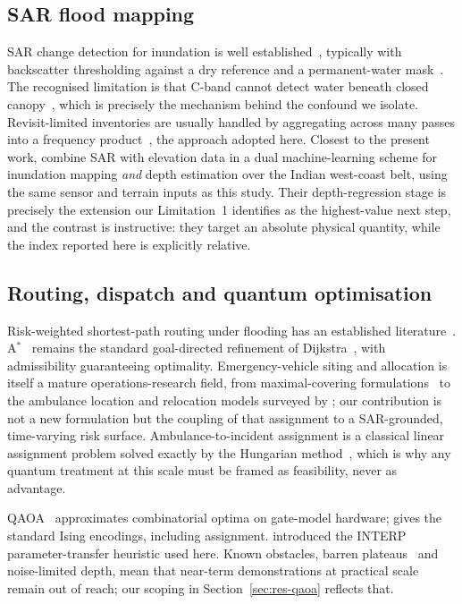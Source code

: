 \documentclass[11pt,a4paper]{article}
\begin{document}
\subsection{SAR flood mapping}
SAR change detection for inundation is well established~\citep{martinis2009,
twele2016,shen2019}, typically with backscatter thresholding against a dry
reference and a permanent-water mask~\citep{pekel2016}. The recognised limitation
is that C-band cannot detect water beneath closed
canopy~\citep{townsend2002,tsyganskaya2018}, which is precisely the mechanism
behind the confound we isolate. Revisit-limited inventories are usually handled
by aggregating across many passes into a frequency
product~\citep{pekel2016,donchyts2016}, the approach adopted here.
Closest to the present work, \citet{sadhwani2026} combine SAR with elevation data
in a dual machine-learning scheme for inundation mapping \emph{and} depth
estimation over the Indian west-coast belt, using the same sensor and terrain
inputs as this study. Their depth-regression stage is precisely the extension our
Limitation~1 identifies as the highest-value next step, and the contrast is
instructive: they target an absolute physical quantity, while the index reported
here is explicitly relative.

\subsection{Routing, dispatch and quantum optimisation}
Risk-weighted shortest-path routing under flooding has an established
literature~\citep{zhang2019,yin2016}. A$^\ast$~\citep{hart1968} remains the
standard goal-directed refinement of Dijkstra~\citep{dijkstra1959}, with
admissibility guaranteeing optimality. Emergency-vehicle siting and allocation is
itself a mature operations-research field, from maximal-covering
formulations~\citep{church1974} to the ambulance location and relocation models
surveyed by \citet{brotcorne2003}; our contribution is not a new formulation but
the coupling of that assignment to a SAR-grounded, time-varying risk surface.
Ambulance-to-incident assignment is a classical linear assignment problem solved
exactly by the Hungarian method~\citep{kuhn1955}, which is why any quantum
treatment at this scale must be framed as feasibility, never as advantage.

QAOA~\citep{farhi2014} approximates combinatorial optima on gate-model hardware;
\citet{lucas2014} gives the standard Ising encodings, including assignment.
\citet{zhou2020} introduced the INTERP parameter-transfer heuristic used here.
Known obstacles, barren plateaus~\citep{mcclean2018} and noise-limited depth,
mean that near-term demonstrations at practical scale remain out of reach; our
scoping in Section~\ref{sec:res-qaoa} reflects that.
\end{document}
